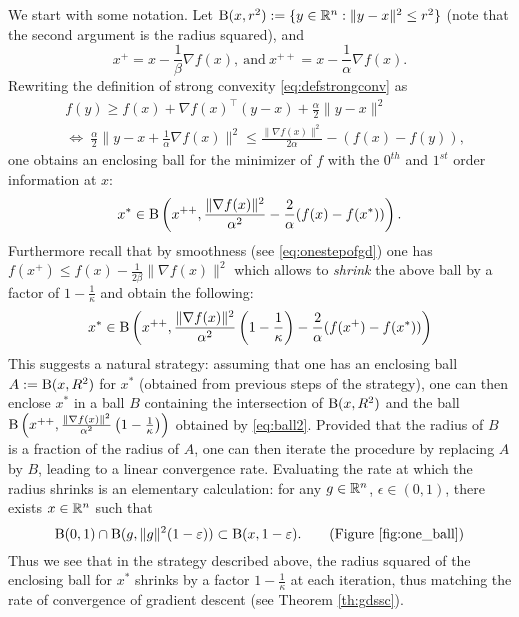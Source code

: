 We start with some notation. Let $\mathrm{B}(x,r^2) := \{y \in \mathbb{R}^n : \|y-x\|^2 \leq r^2 \}$ (note that the second argument is the radius squared), and
$$x^+ = x - \frac{1}{\beta} \nabla f(x), \ \text{and} \ x^{++} = x - \frac{1}{\alpha} \nabla f(x) . $$
Rewriting the definition of strong convexity \eqref{eq:defstrongconv} as
\begin{eqnarray*}
& f(y) \geq f(x) + \nabla f(x)^{\top} (y-x) + \frac{\alpha}{2} \|y-x\|^2 \\
& \Leftrightarrow \ \frac{\alpha}{2} \|y - x + \frac{1}{\alpha} \nabla f(x) \|^2 \leq \frac{\|\nabla f(x)\|^2}{2 \alpha} - (f(x) - f(y)),
\end{eqnarray*}
one obtains an enclosing ball for the minimizer of $f$ with the $0^{th}$ and $1^{st}$ order information at $x$:
$$x^* \in \mathrm{B}\left(x^{++}, \frac{\|\nabla f(x)\|^2}{\alpha^2} - \frac{2}{\alpha} (f(x) - f(x^*)) \right) .$$
Furthermore recall that by smoothness (see \eqref{eq:onestepofgd}) one has $f(x^+) \leq f(x) - \frac{1}{2 \beta} \|\nabla f(x)\|^2$ which allows to \emph{shrink} the above ball by a factor of $1-\frac{1}{\kappa}$ and obtain the following:
\begin{equation} \label{eq:ball2}
x^* \in \mathrm{B}\left(x^{++}, \frac{\|\nabla f(x)\|^2}{\alpha^2} \left(1 - \frac{1}{\kappa}\right) - \frac{2}{\alpha} (f(x^+) - f(x^*)) \right) 
\end{equation}
This suggests a natural strategy: assuming that one has an enclosing ball $A:=\mathrm{B}(x,R^2)$ for $x^*$ (obtained from previous steps of the strategy), one can then enclose $x^*$ in a ball $B$ containing the intersection of $\mathrm{B}(x,R^2)$ and the ball $\mathrm{B}\left(x^{++}, \frac{\|\nabla f(x)\|^2}{\alpha^2} \left(1 - \frac{1}{\kappa}\right)\right)$ obtained by \eqref{eq:ball2}. Provided that the radius of $B$ is a fraction of the radius of $A$, one can then iterate the procedure by replacing $A$ by $B$, leading to a linear convergence rate. Evaluating  the rate at which the radius shrinks is an elementary calculation: for any $g \in \mathbb{R}^n$, $\epsilon \in (0,1)$, there exists $x \in \mathbb{R}^n$ such that
$$\mathrm{B}(0,1) \cap \mathrm{B}(g, \|g\|^2 (1- \varepsilon)) \subset \mathrm{B}(x, 1-\varepsilon) . \quad \quad \text{(Figure \ref{fig:one_ball})}$$
Thus we see that in the strategy described above, the radius squared of the enclosing ball for $x^*$ shrinks by a factor $1 - \frac{1}{\kappa}$ at each iteration, thus matching the rate of convergence of gradient descent (see Theorem \ref{th:gdssc}).

